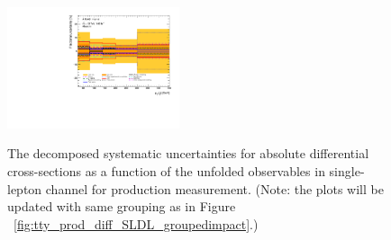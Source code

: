 \begin{figure}[ht]
  \includegraphics[width=0.45\textwidth]{figures/diff_xsec/groupedimpact-absolute-xsec/tty_prod_SL/Uncertainty_tty_ptj1.pdf}\\%
\caption{The decomposed systematic uncertainties for absolute differential cross-sections as a function of the unfolded observables in single-lepton channel for \tty production measurement. 
(Note: the plots will be updated with same grouping as in Figure ~\ref{fig:tty_prod_diff_SLDL_groupedimpact}.)}
\label{fig:tty_prod_diff_Ljets_groupedimpact}
\end{figure}
\FloatBarrier

